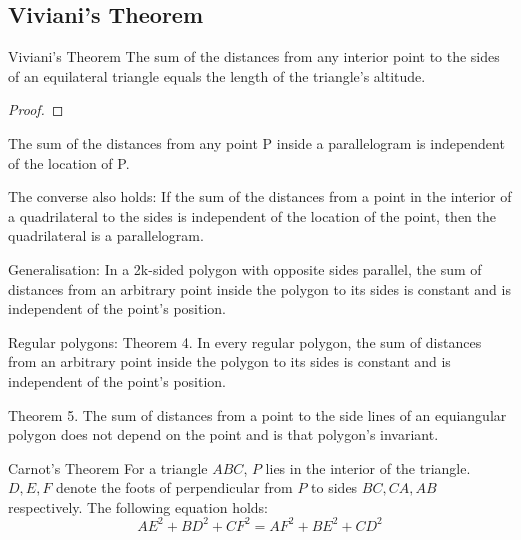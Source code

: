 \subsection{Viviani's Theorem}
\begin{thrm}{Viviani's Theorem}{}
The sum of the distances from any interior point to the sides of an equilateral triangle equals the length of the triangle's altitude. 
\end{thrm}

\begin{proof}

\end{proof}

\begin{thrm}{}{}
The sum of the distances from any point P inside a parallelogram is independent of the location of P.

The converse also holds: If the sum of the distances from a point in the interior of a quadrilateral to the sides is independent of the location of the point, then the quadrilateral is a parallelogram.
\end{thrm}

\begin{thrm}{}{}
Generalisation: In a 2k-sided polygon with opposite sides parallel, the sum of distances from an arbitrary point inside the polygon to its sides is constant and is independent of the point's position.
\end{thrm}


Regular polygons:
Theorem 4. In every regular polygon, the sum of distances from an arbitrary point
inside the polygon to its sides is constant and is independent of the point's position.

Theorem 5. The sum of distances from a point to the side lines of an equiangular
polygon does not depend on the point and is that polygon's invariant.

\begin{thrm}{Carnot's Theorem}{}
For a triangle $ABC$, $P$ lies in the interior of the triangle. $D,E,F$ denote the foots of perpendicular from $P$ to sides $BC,CA,AB$ respectively. The following equation holds:
\begin{equation}AE^2 + BD^2 + CF^2 = AF^2 + BE^2 + CD^2\end{equation}
\end{thrm}

\begin{figure}[H]
    \centering
\end{figure}

